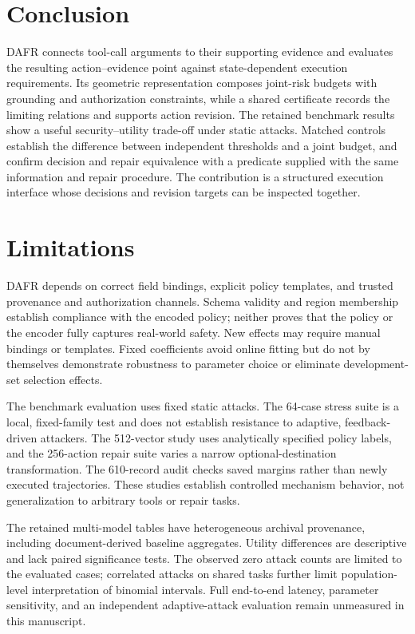 \documentclass[letterpaper]{article}
\begin{document}
\section{Conclusion}

DAFR connects tool-call arguments to their supporting evidence and evaluates the resulting action--evidence point against state-dependent execution requirements. Its geometric representation composes joint-risk budgets with grounding and authorization constraints, while a shared certificate records the limiting relations and supports action revision. The retained benchmark results show a useful security--utility trade-off under static attacks. Matched controls establish the difference between independent thresholds and a joint budget, and confirm decision and repair equivalence with a predicate supplied with the same information and repair procedure. The contribution is a structured execution interface whose decisions and revision targets can be inspected together.

\section{Limitations}

DAFR depends on correct field bindings, explicit policy templates, and trusted provenance and authorization channels. Schema validity and region membership establish compliance with the encoded policy; neither proves that the policy or the encoder fully captures real-world safety. New effects may require manual bindings or templates. Fixed coefficients avoid online fitting but do not by themselves demonstrate robustness to parameter choice or eliminate development-set selection effects.

The benchmark evaluation uses fixed static attacks. The 64-case stress suite is a local, fixed-family test and does not establish resistance to adaptive, feedback-driven attackers. The 512-vector study uses analytically specified policy labels, and the 256-action repair suite varies a narrow optional-destination transformation. The 610-record audit checks saved margins rather than newly executed trajectories. These studies establish controlled mechanism behavior, not generalization to arbitrary tools or repair tasks.

The retained multi-model tables have heterogeneous archival provenance, including document-derived baseline aggregates. Utility differences are descriptive and lack paired significance tests. The observed zero attack counts are limited to the evaluated cases; correlated attacks on shared tasks further limit population-level interpretation of binomial intervals. Full end-to-end latency, parameter sensitivity, and an independent adaptive-attack evaluation remain unmeasured in this manuscript.


\end{document}
